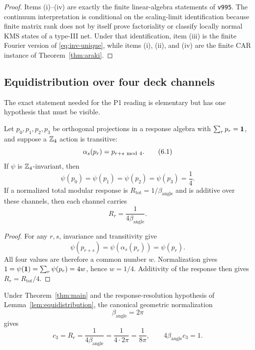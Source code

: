 \begin{proof}
Items (i)--(iv) are exactly the finite linear-algebra statements of
\texttt{v995}.  The continuum interpretation is conditional on the
scaling-limit identification because finite matrix rank does not by
itself prove factoriality or classify locally normal KMS states of a
type-III net.  Under that identification, item (iii) is the finite
Fourier version of \eqref{eq:inv-unique}, while items (i), (ii), and
(iv) are the finite CAR instance of Theorem~\ref{thm:araki}.
\end{proof}

\subsection{Equidistribution over four deck channels}

The exact statement needed for the P1 reading is elementary but has
one hypothesis that must be visible.

\begin{lemma}
\label{lem:equidistribution}
Let $p_0,p_1,p_2,p_3$ be orthogonal projections in a response
algebra with $\sum_rp_r=\mathbf 1$, and suppose a $\mathbb Z_4$ action is
transitive:
\[
 \alpha_s(p_r)=p_{r+s\ {\rm mod}\ 4}.
\tag{6.1}\label{eq:transitive}
\]
If $\psi$ is $\mathbb Z_4$-invariant, then
\[
 \psi(p_0)=\psi(p_1)=\psi(p_2)=\psi(p_3)=\frac14.
\tag{6.2}\label{eq:quarter}
\]
If a normalized total modular response is
$R_{\mathrm{tot}}=1/\beta_{\mathrm{angle}}$ and is additive over
these channels, then each channel carries
\[
 R_r=\frac1{4\beta_{\mathrm{angle}}}.
\tag{6.3}\label{eq:response-quarter}
\]
\end{lemma}

\begin{proof}
For any $r,s$, invariance and transitivity give
\[
 \psi(p_{r+s})=\psi(\alpha_s(p_r))=\psi(p_r).
\]
All four values are therefore a common number $w$.  Normalization
gives $1=\psi(\mathbf 1)=\sum_r\psi(p_r)=4w$, hence $w=1/4$.
Additivity of the response then gives
$R_r=R_{\mathrm{tot}}/4$.
\end{proof}

\begin{corollary}
\label{cor:p1}
Under Theorem~\ref{thm:main} and the response-resolution hypothesis
of Lemma~\ref{lem:equidistribution}, the canonical geometric
normalization
\[
 \beta_{\mathrm{angle}}=2\pi
\tag{6.4}\label{eq:beta-angle}
\]
gives
\[
 c_3=R_r
 =\frac1{4\beta_{\mathrm{angle}}}
 =\frac1{4\cdot2\pi}
 =\frac1{8\pi},
\qquad
 4\beta_{\mathrm{angle}}c_3=1.
\tag{6.5}\label{eq:p1}
\]
\end{corollary}

